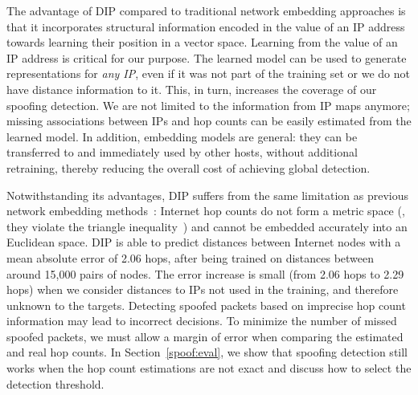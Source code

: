 


The advantage of DIP compared to traditional network embedding approaches is that it incorporates structural information encoded in the value of an IP address towards learning their position in a vector space. Learning from the value of an IP address is critical for our purpose. The learned model can be used to generate representations for {\em any IP}, even if it was not part of the training set or we do not have distance information to it. This, in turn, increases the coverage of our spoofing detection. We are not limited to the information from IP maps anymore; missing associations between IPs and hop counts can be easily estimated from the learned model. In addition, embedding models are general: they can be transferred to and immediately used by other hosts, without additional retraining, thereby reducing the overall cost of achieving global detection.

Notwithstanding its advantages, DIP suffers from the same limitation as previous network embedding methods~\citep{vivaldi,gnp,pic,pyxida,barford-infocom}: Internet hop counts do not form a metric space (\eg{}, they violate the triangle inequality~\citep{peerwise}) and cannot be embedded accurately into an Euclidean space. DIP is able to predict distances between Internet nodes with a mean absolute error of 2.06 hops, after being trained on distances between around 15,000 pairs of nodes. The error increase is small (from 2.06 hops to 2.29 hops) when we consider distances to IPs not used in the training, and therefore unknown to the targets. 
%
Detecting spoofed packets based on imprecise hop count information may lead to incorrect decisions. To minimize the number of missed spoofed packets, we must allow a margin of error when comparing the estimated and real hop counts. 
%
In Section~\ref{spoof:eval}, we show that spoofing detection still works when the hop count estimations are not exact and discuss how to select the detection threshold.

